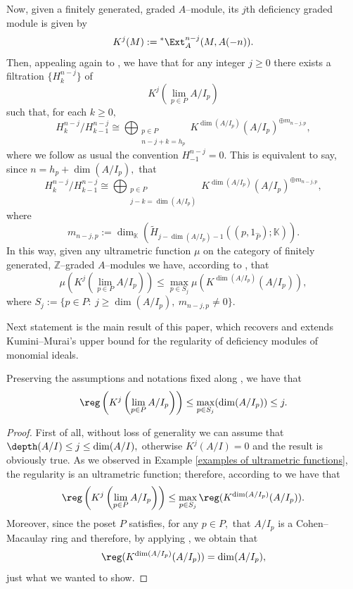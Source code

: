 \documentclass[11pt]{amsart}
\begin{document}
\begin{disc}
Now, given a finitely generated, graded $A$--module, its $j$th deficiency graded module is given by
\[
K^j (M):=\hbox{}^*\Ext_A^{n-j} (M,A(-n)).
\]
Then, appealing again to , we have that for any integer $j\geq 0$ there exists a filtration $\{H_k^{n-j}\}$ of
\[
K^j \left(\lim_{p\in P} A/I_p\right)
\]
such that, for each $k\geq 0,$
\[
H_k^{n-j}/H_{k-1}^{n-j}\cong\bigoplus_{\substack{p\in P\\ n-j+k=h_p}} K^{\dim (A/I_p)} (A/I_p)^{\oplus m_{n-j,p}},
\]
where we follow as usual the convention $H_{-1}^{n-j}=0.$ This is equivalent to say, since $n=h_p+\dim (A/I_p),$ that
\[
H_k^{n-j}/H_{k-1}^{n-j}\cong\bigoplus_{\substack{p\in P\\ j-k=\dim (A/I_p)}} K^{\dim (A/I_p)} (A/I_p)^{\oplus m_{n-j,p}},
\]
where
\[
m_{n-j,p}:=\dim_{\mathbb{K}}\left(\widetilde{H}_{j-\dim(A/I_p)-1}((p,1_{\widehat{P}});\mathbb{K})\right).
\]
In this way, given any ultrametric function $\mu$ on the category of finitely generated, $\mathbb{Z}$--graded $A$--modules we have, according to , that
\begin{equation}\label{general inequality}
\mu\left(K^j \left(\lim_{p\in P} A/I_p\right)\right)\leq\max_{p\in S_j}\mu\left(K^{\dim (A/I_p)} (A/I_p)\right),
\end{equation}
where $S_j:=\{p\in P:\ j\geq\dim (A/I_p),\ m_{n-j,p}\neq 0\}$.
\end{disc}

Next statement is the main result of this paper, which recovers and extends Kumini--Murai's upper bound for the regularity of deficiency modules of monomial ideals.

\begin{teo}
Preserving the assumptions and notations fixed along , we have that
\[
\reg\left(K^j\left(\lim_{p\in P} A/I_p\right)\right)\leq\max_{p\in S_j} (\dim (A/I_p))\leq j.
\]
\end{teo}

\begin{proof}
First of all, without loss of generality we can assume that $\depth(A/I)\leq j\leq\dim (A/I),$ otherwise $K^j (A/I)=0$ and the result is obviously true. As we observed in Example \ref{examples of ultrametric functions}, the regularity is an ultrametric function; therefore, according to  we have that
\[
\reg\left(K^j\left(\lim_{p\in P} A/I_p\right)\right)\leq\max_{p\in S_j}\reg(K^{\dim (A/I_p)}(A/I_p)).
\]
Moreover, since the poset $P$ satisfies, for any $p\in P,$ that $A/I_p$ is a Cohen--Macaulay ring and therefore, by applying \cite[Proposition 2.3]{HaHoa2008}, we obtain that
\[
\reg(K^{\dim (A/I_p)}(A/I_p))=\dim (A/I_p),
\]
just what we wanted to show.
\end{proof}
\end{document}
